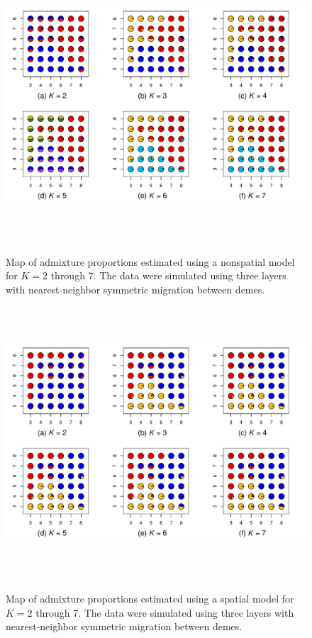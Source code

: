 \documentclass[10pt,letterpaper]{article}
\begin{document}
\begin{figure}
	\centering
		{\includegraphics[width=6in,height=4in]{figs/sims/simK3_nsp_pies.pdf}}
	\caption{
	Map of admixture proportions estimated using a nonspatial model for $K=2$ through 7.
	The data were simulated using three layers with nearest-neighbor symmetric migration between demes.
    }\label{simK3_nsp_pies}
\end{figure}

\begin{figure}
	\centering
		{\includegraphics[width=6in,height=4in]{figs/sims/simK3_sp_pies.pdf}}
	\caption{
	Map of admixture proportions estimated using a spatial model for $K=2$ through 7.
	The data were simulated using three layers with nearest-neighbor symmetric migration between demes.
    }\label{simK3_sp_pies}
\end{figure}
\clearpage
\end{document}
